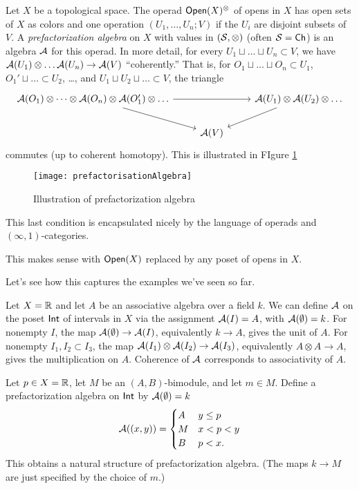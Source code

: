 \begin{dfn}
	Let $X$ be a topological space.
	The operad $\mathsf{Open}(X)^{\otimes}$ of opens in $X$ has open sets of $X$ as colors and one operation $(U_1, \dots, U_n; V)$ if the $U_i$ are disjoint subsets of $V$.
	A \emph{prefactorization algebra} on $X$ with values in $(\mathcal{S}, \otimes)$ (often $\mathcal{S} = \mathsf{Ch}$) is an algebra $\mathcal{A}$ for this operad.
	In more detail, for every $U_1 \sqcup \dots \sqcup U_n \subset V$, we have $\mathcal{A}(U_1) \otimes \dots \mathcal{A}(U_n) \to \mathcal{A}(V)$ ``coherently.''
	That is, for $O_1 \sqcup \dots \sqcup O_n \subset U_1$, $O_1' \sqcup \dots \subset U_2$, \dots, and $U_1 \sqcup U_2 \sqcup \dots \subset V$, the triangle
	\[
		\begin{tikzcd}
			\Ac(O_1) \otimes \dots \otimes \Ac(O_n) \otimes \Ac(O_1') \otimes \dots \ar[rr] \ar[dr] & & \Ac(U_1) \otimes \Ac(U_2) \otimes \dots \ar[dl] \\
														& \Ac(V) &
		\end{tikzcd}
	\]
	commutes (up to coherent homotopy). This is illustrated in FIgure \ref{fig:prefactorisationAlgebra}
	\begin{figure}[h]
		\centering
		\texttt{[image: prefactorisationAlgebra]}
		\caption{Illustration of prefactorization algebra}
		\label{fig:prefactorisationAlgebra}
	\end{figure}
	This last condition is encapsulated nicely by the language of operads and $(\infty, 1)$-categories.
\end{dfn}

\begin{rmk}
	This makes sense with $\mathsf{Open}(X)$ replaced by any poset of opens in $X$.
\end{rmk}

Let's see how this captures the examples we've seen so far.

\begin{ex}
	Let $X = \mathbb{R}$ and let $A$ be an associative algebra over a field $k$.
	We can define $\mathcal{A}$ on the poset $\mathsf{Int}$ of intervals in $X$ via the assignment $\mathcal{A}(I) = A$, with $\mathcal{A}(\emptyset) = k$.
	For nonempty $I$, the map $\mathcal{A}(\emptyset) \to \mathcal{A}(I)$, equivalently $k \to A$, gives the unit of $A$.
	For nonempty $I_1, I_2 \subset I_3$, the map $\mathcal{A}(I_1) \otimes \mathcal{A}(I_2) \to \mathcal{A}(I_3)$, equivalently $A \otimes A \to A$, gives the multiplication on $A$.
	Coherence of $\mathcal{A}$ corresponds to associativity of $A$.
\end{ex}

\begin{ex}
	Let $p \in X = \mathbb{R}$, let $M$ be an $(A, B)$-bimodule, and let $m \in M$.
	Define a prefactorization algebra on $\mathsf{Int}$ by $\mathcal{A}(\emptyset) = k$
	\[
		\mathcal{A}((x, y)) = \begin{cases}
			A & y \leq p \\
			M & x < p < y \\
			B & p < x.
		\end{cases}
	\]
	This obtains a natural structure of prefactorization algebra.
	(The maps $k \to M$ are just specified by the choice of $m$.)
\end{ex}

